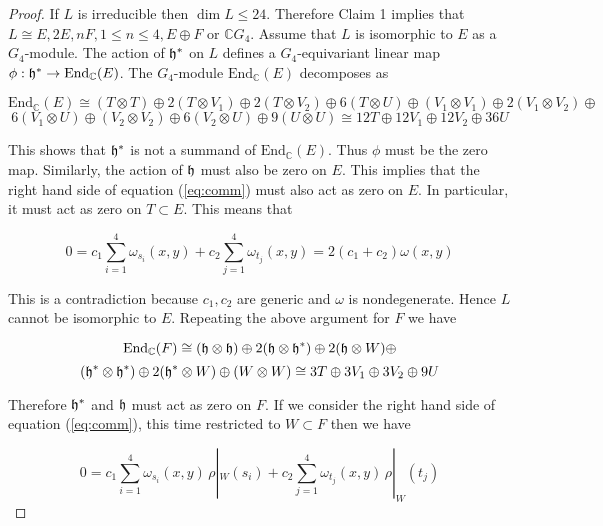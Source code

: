 \documentclass[a4apper,10pt]{amsart}
\theoremstyle{definition}
\numberwithin{thm}{section}
\newcommand{\C}{\mathbb{C}}
\newcommand{\End}{\textrm{End}}
\begin{document}
\begin{proof}
\noindent If $L$ is irreducible then $\dim L \le 24$. Therefore Claim 1 implies that $L \cong E,2E,nF,1 \le n \le 4, E \oplus F$ or $\C G_4$. Assume that $L$ is isomorphic to $E$ as a $G_4$-module. The action of $\frak{h}^*$ on $L$ defines a $G_4$-equivariant linear map $\phi : \frak{h}^* \rightarrow
\End_{\C} (E)$. The $G_4$-module $\End_{\C}(E)$ decomposes as 

\begin{displaymath}
\End_{\C}(E) \cong (T \otimes T) \oplus 2(T \otimes V_1) \oplus  2(T \otimes V_2) \oplus 6(T \otimes U) \oplus (V_1 \otimes V_1) \oplus 2(V_1 \otimes V_2) \oplus
\end{displaymath}
\begin{displaymath}
6(V_1 \otimes U) \oplus (V_2 \otimes V_2) \oplus 6(V_2 \otimes U) \oplus 9(U \otimes U) \cong 12T \oplus 12V_1 \oplus 12V_2 \oplus 36U
\end{displaymath}

\noindent This shows that $\frak{h}^*$ is not a summand of $\End_{\C}(E)$. Thus $\phi$ must be the zero map. Similarly, the action of $\frak{h}$ must also be zero on $E$. This implies that the right hand side of equation (\ref{eq:comm}) must also act as zero on $E$. In particular, it must act as zero on $T \subset E$. This means that 

\begin{displaymath}
0 = c_1 \sum_{i = 1}^4 \omega_{s_i}(x,y) + c_2 \sum_{j = 1}^4 \omega_{t_j}(x,y) = 2(c_1 + c_2)\omega(x,y)
\end{displaymath}

\noindent This is a contradiction because $c_1,c_2$ are generic and $\omega$ is nondegenerate. Hence $L$ cannot be isomorphic to $E$. Repeating the above argument for $F$ we have 

\begin{displaymath}
\End_{\C}(F) \cong (\frak{h} \otimes \frak{h}) \oplus 2(\frak{h} \otimes \frak{h}^*) \oplus 2(\frak{h} \otimes W) \oplus
\end{displaymath}
\begin{displaymath}
(\frak{h}^* \otimes \frak{h}^*) \oplus 2(\frak{h}^* \otimes W) \oplus (W \otimes W) \cong 3T \oplus 3V_1 \oplus 3V_2 \oplus 9U
\end{displaymath}

\noindent Therefore $\frak{h}^*$ and $\frak{h}$ must act as zero on $F$. If we consider the right hand side of equation (\ref{eq:comm}), this time restricted to $W \subset F$ then we have

\begin{displaymath}
0 = c_1 \sum_{i = 1}^4 \omega_{s_i}(x,y) \, \rho|_{W}(s_i) + c_2 \sum_{j = 1}^4 \omega_{t_j}(x,y) \, \rho|_W(t_j)
\end{displaymath}


\end{proof}
\end{document}

